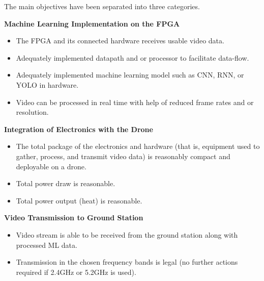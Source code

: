 The main objectives have been separated into three categories.

\textbf{Machine Learning Implementation on the FPGA}
\begin{itemize}
  \item The FPGA and its connected hardware receives usable video data.
  \item Adequately implemented datapath and or processor to facilitate data-flow.
  \item Adequately implemented machine learning model such as CNN, RNN, or YOLO in hardware.
  \item Video can be processed in real time with help of reduced frame rates and or resolution.
\end{itemize}

\textbf{Integration of Electronics with the Drone}
\begin{itemize}
  \item The total package of the electronics and hardware (that is, equipment
  used to gather, process, and transmit video data) is reasonably compact 
  and deployable on a drone.
  \item Total power draw is reasonable.
  \item Total power output (heat) is reasonable.
\end{itemize}

\textbf{Video Transmission to Ground Station}
\begin{itemize}
  \item Video stream is able to be received from the ground station along 
        with processed ML data.
  \item Transmission in the chosen frequency bands is legal (no further actions
        required if 2.4GHz or 5.2GHz is used).
\end{itemize}